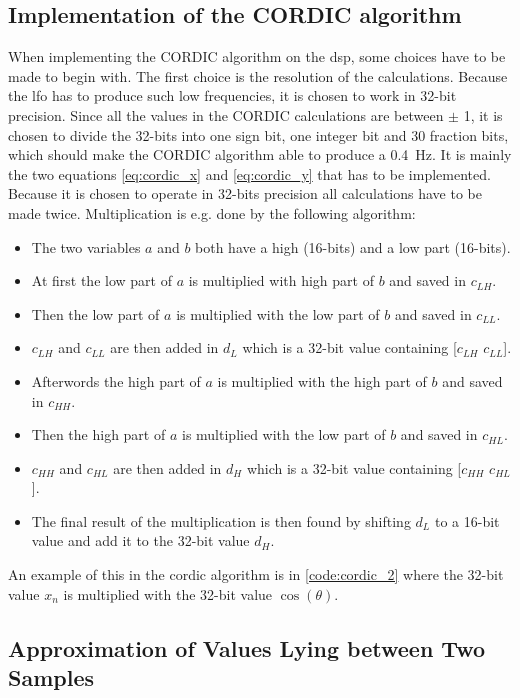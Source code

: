 \subsection{Implementation of the CORDIC algorithm}
When implementing the CORDIC algorithm on the \gls{dsp}, some choices have to be made to begin with. The first choice is the resolution of the calculations. Because the \gls{lfo} has to produce such low frequencies, it is chosen to work in 32-bit precision. Since all the values in the CORDIC calculations are between $\pm$ 1, it is chosen to divide the 32-bits into one sign bit, one integer bit and 30 fraction bits, which should make the CORDIC algorithm able to produce a \SI{0.4}{\hertz}.
It is mainly the two equations \autoref{eq:cordic_x} and \autoref{eq:cordic_y} that has to be implemented. Because it is chosen to operate in 32-bits precision all calculations have to be made twice. Multiplication is e.g. done by the following algorithm:
\begin{itemize}
\item The two variables $a$ and $b$ both have a high (16-bits) and a low part (16-bits).
\item At first the low part of $a$ is multiplied with high part of $b$ and saved in $c_{LH}$.
\item Then the low part of $a$ is multiplied with the low part of $b$ and saved in $c_{LL}$.
\item $c_{LH}$ and $c_{LL}$ are then added in $d_L$ which is a 32-bit value containing [$c_{LH}$ $c_{LL}$].
\item Afterwords the high part of $a$ is multiplied with the high part of $b$ and saved in $c_{HH}$.
\item Then the high part of $a$ is multiplied with the low part of $b$ and saved in $c_{HL}$.
\item $c_{HH}$ and $c_{HL}$ are then added in $d_H$ which is a 32-bit value containing [$c_{HH}$ $c_{HL}$].
\item The final result of the multiplication is then found by shifting $d_L$ to a 16-bit value and add it to the 32-bit value $d_H$.
\end{itemize}

An example of this in the \gls{cordic} algorithm is in \autoref{code:cordic_2} where the 32-bit value $x_n$ is multiplied with the 32-bit value $\cos(\theta)$.

\subsection{Approximation of Values Lying between Two Samples}

